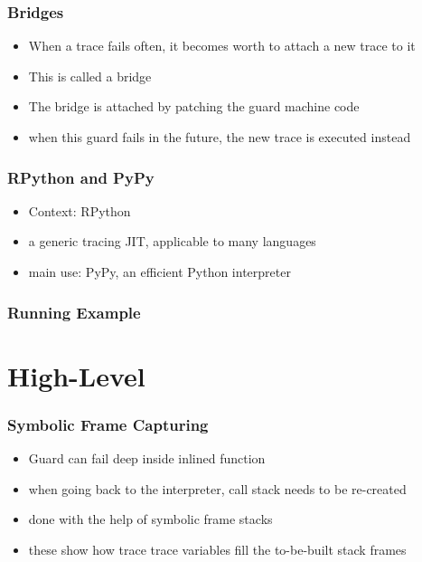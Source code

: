 \documentclass[utf8x]{beamer}
\begin{document}

\begin{frame}
  \frametitle{Bridges}
  \begin{itemize}
      \item When a trace fails often, it becomes worth to attach a new trace to it
          \item This is called a bridge
          \item The bridge is attached by patching the guard machine code
          \item when this guard fails in the future, the new trace is executed instead
  \end{itemize}
\end{frame}

\begin{frame}
  \frametitle{RPython and PyPy}
  \begin{itemize}
      \item Context: RPython
      \item a generic tracing JIT, applicable to many languages
      \item main use: PyPy, an efficient Python interpreter
  \end{itemize}
\end{frame}

\begin{frame}
  \frametitle{Running Example}
\end{frame}

\section{High-Level}

\begin{frame}
  \frametitle{Symbolic Frame Capturing}
  \begin{itemize}
      \item Guard can fail deep inside inlined function
      \item when going back to the interpreter, call stack needs to be re-created
      \item done with the help of symbolic frame stacks
      \item these show how trace trace variables fill the to-be-built stack frames
  \end{itemize}
\end{frame}
\end{document}
